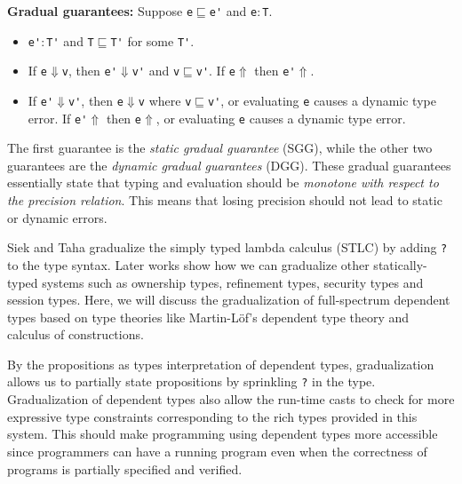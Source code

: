 \documentclass{article}
\begin{document}
\textbf{Gradual guarantees: } Suppose \verb|e|\(\sqsubseteq\)\verb|e'| and
\verb|e|\(:\)\verb|T|.
  \begin{itemize}
  \item \verb|e'|\(:\)\verb|T'| and
    \verb|T|\(\sqsubseteq\)\verb|T'| for some \verb|T'|.
  \item If \verb|e|\(\Downarrow\)\verb|v|, then \verb|e'|\(\Downarrow\)\verb|v'|
    and \verb|v|\(\sqsubseteq\)\verb|v'|. If \verb|e|\(\Uparrow\) then
    \verb|e'|\(\Uparrow\).
  \item If \verb|e'|\(\Downarrow\)\verb|v'|, then \verb|e|\(\Downarrow\)\verb|v|
    where \verb|v|\(\sqsubseteq\)\verb|v'|, or evaluating \verb|e| causes a
    dynamic type error. If \verb|e'|\(\Uparrow\) then \verb|e|\(\Uparrow\), or
    evaluating \verb|e| causes a dynamic type error.
  \end{itemize}
 The first guarantee is the \textit{static gradual guarantee} (SGG), while the
 other two guarantees are the \textit{dynamic gradual guarantees} (DGG). These
 gradual guarantees essentially state that typing and evaluation should be
 \textit{monotone with respect to the precision relation}. This means that
 losing precision should not lead to static or dynamic errors.

Siek and Taha \cite{siek_gradual_2006} gradualize the simply typed lambda
calculus (STLC) by adding \verb|?| to the type syntax. Later works show how we
can gradualize other statically-typed systems such as ownership
types\cite{sergey_gradual_2012}, refinement types\cite{lehmann_gradual_2017},
security
types\cite{fennell_gradual_2013}\cite{toro_type-driven_2018}\cite{chen_quest_2024}
and session types\cite{igarashi_gradual_2017}. Here, we will discuss the
gradualization of full-spectrum dependent types based on type theories like
Martin-L\"of’s dependent type theory\cite{martin-lof_intuitionistic_1984} and
calculus of constructions\cite{coquand_calculus_1988}.

By the propositions as types interpretation of dependent types, gradualization
allows us to partially state propositions by sprinkling \verb|?| in the type.
Gradualization of dependent types also allow the run-time casts to check for
more expressive type constraints corresponding to the rich types provided in
this system. This should make programming using dependent types more accessible
since programmers can have a running program even when the correctness of
programs is partially specified and verified.
\end{document}
